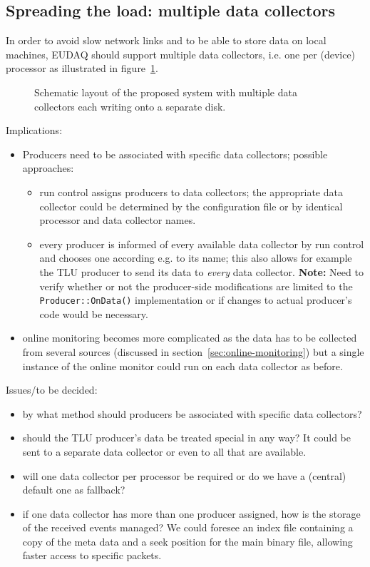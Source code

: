 \documentclass[paper=a4, fontsize=11pt]{scrartcl}	%
\numberwithin{equation}{section}		%
\numberwithin{figure}{section}			%
\numberwithin{table}{section}           	%
\begin{document}
\subsection{Spreading the load: multiple data collectors}
\label{sec:datacollectors}
In order to avoid slow network links and to be able to store data on
local machines, EUDAQ should support multiple data collectors,
i.e. one per (device) processor as illustrated in figure~\ref{fig:schematiclayout}.

\begin{figure}[htbp]
  \centering
  
  \caption{Schematic layout of the proposed system with multiple data
    collectors each writing onto a separate disk.}
\label{fig:schematiclayout}
\end{figure}

Implications:
\begin{itemize}
\item Producers need to be associated with specific data collectors;
  possible approaches:
  \begin{itemize}
  \item run control assigns producers to data
    collectors; the appropriate data collector could be determined by the
    configuration file or by identical processor and data collector names.
  \item every producer is informed of every available data collector
    by run control and chooses one according e.g. to its name; this
    also allows for example the TLU producer to send its data to
    \emph{every} data collector. \textbf{Note:} Need to verify whether
    or not the producer-side modifications are limited to the
    \texttt{Producer::OnData()} implementation or if changes to actual
    producer's code would be necessary.
  \end{itemize}
\item online monitoring becomes more complicated as the data has to be
  collected from several sources (discussed in
  section~\ref{sec:online-monitoring}) but a single instance of the online monitor
  could run on each data collector as before.
\end{itemize}

Issues/to be decided:
\begin{itemize}
\item by what method should producers be associated with specific data collectors?
\item should the TLU producer's data be treated special in any way? It
  could be sent to a separate data collector or even to all that are available.
\item will one data collector per processor be required or do we have
  a (central) default one as fallback?
\item if one data collector has more than one producer assigned, how
  is the storage of the received events managed? We could foresee an
  index file containing a copy of the meta data and a seek position
  for the main binary file, allowing faster access to specific packets.
\end{itemize}
\end{document}
